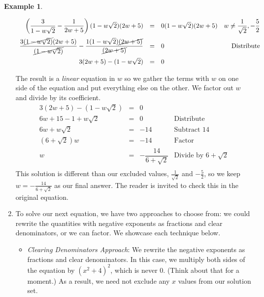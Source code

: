 \documentclass[11pt]{article}
\theoremstyle{definition}  %
\newtheorem{ex}{\bf Example}
\begin{document}
\begin{ex}
\begin{enumerate}
\[\begin{array}{rclr}
\left(\dfrac{3}{1 - w\sqrt{2}} - \dfrac{1}{2w+5}\right)(1 - w\sqrt{2})(2w+5) & = &  0 (1 - w\sqrt{2})(2w+5)  & w \neq \dfrac{1}{\sqrt{2}}, -\dfrac{5}{2} \\ [12pt]

\dfrac{3\cancel{(1 - w\sqrt{2})}(2w+5) }{\cancel{(1 - w\sqrt{2})}}- \dfrac{1(1 - w\sqrt{2})\cancel{(2w+5)}}{\cancel{(2w+5)}} & = & 0 & \text{Distribute} \\ [12pt]

3(2w+5) - (1-w\sqrt{2}) & = & 0 & \\  \end{array}\]

The result is a \textit{linear} equation in $w$ so we gather the terms with $w$ on one side of the equation and put everything else on the other.  We factor out $w$ and divide by its coefficient. \[ \begin{array}{rclr}

3(2w+5) - (1-w\sqrt{2}) & = & 0 & \\

6w + 15 - 1 + w\sqrt{2} & = & 0 & \text{Distribute} \\

6w + w\sqrt{2} & = & -14 & \text{Subtract $14$} \\

(6 + \sqrt{2})w & = & -14 & \text{Factor} \\

w & = & -\dfrac{14}{6 + \sqrt{2}} & \text{Divide by $6 + \sqrt{2}$} \\ 

\end{array}\] This solution is different than our excluded values, $\frac{1}{\sqrt{2}}$ and $-\frac{5}{2}$, so we keep $w = -\frac{14}{6 + \sqrt{2}}$ as our final answer.  The reader is invited to check this in the original equation.

\item  To solve our next equation, we have two approaches to choose from:  we could rewrite the quantities with negative exponents as fractions and clear denominators, or we can factor.  We showcase each technique below.

\begin{itemize}

\item \textit{Clearing Denominators Approach}:  We rewrite the negative exponents as fractions and clear denominators.  In this case, we multiply both sides of the equation by $(x^2+4)^2$, which is never $0$. (Think about that for a moment.)  As a result, we need not exclude any $x$ values from our solution set.\[ \begin{array}{rclr}


\end{array}\]
\end{itemize}
\end{enumerate}
\end{ex}
\end{document}
